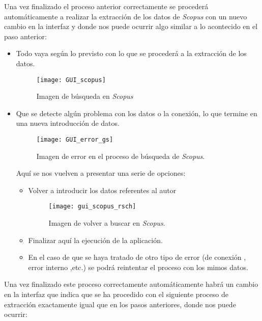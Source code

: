 Una vez finalizado el proceso anterior correctamente se procederá automáticamente a realizar la extracción de los datos de \emph{Scopus} con un nuevo cambio en la interfaz y donde nos puede ocurrir algo similar a lo acontecido en el paso anterior:
\begin{itemize}
	\item Todo vaya según lo previsto con lo que se procederá a la extracción de los datos.
	
	\begin{figure}[H]
	\centering
	\texttt{[image: GUI\_scopus]}
	\caption{Imagen de búsqueda en \emph{Scopus}}
	\end{figure}
	
	\item Que se detecte algún problema con los datos o la conexión, lo que termine en una nueva introducción de datos.
	
	\begin{figure}[H]
	\centering
	\texttt{[image: GUI\_error\_gs]}
	\caption{Imagen de error en el proceso de búsqueda de \emph{Scopus}.}
	\end{figure}
	
	Aquí se nos vuelven a presentar una serie de opciones:
	\begin{itemize}
		\item Volver a introducir los datos referentes al autor 
			
		\begin{figure}[H]
		\centering
		\texttt{[image: gui\_scopus\_rsch]}
		\caption{Imagen de volver a buscar en \emph{Scopus}.}
		\end{figure}
	
		\item Finalizar aquí la ejecución de la aplicación.
		\item En el caso de que se haya tratado de otro tipo de error (de conexión , error interno ,etc.) se podrá reintentar el proceso con los mimos datos.
	\end{itemize}
\end{itemize}
Una vez finalizado este proceso correctamente automáticamente habrá un cambio en la interfaz que indica que se ha procedido con el siguiente proceso de extracción exactamente igual que en los pasos anteriores, donde nos puede ocurrir:
